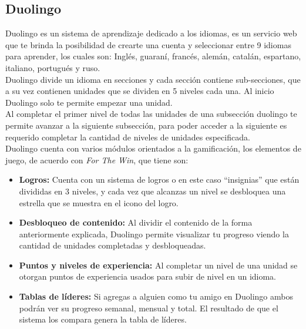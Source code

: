 \begin{multicols*}{2}    
\subsection*{Duolingo}
    
 Duolingo \cite{PagDuolingo} es un sistema de aprendizaje dedicado a los idiomas, es un servicio web que
 te brinda la posibilidad de crearte una cuenta y seleccionar entre 9 idiomas para aprender,
 los cuales son: Inglés, guaraní, francés, alemán, catalán, espartano, italiano, portugués y ruso.\\

 \noindent Duolingo divide un idioma en secciones y cada sección contiene sub-secciones,
 que a su vez contienen unidades que se dividen en 5 niveles cada una. Al inicio Duolingo
 solo te permite empezar una unidad.\\

 \noindent Al completar el primer nivel de todas las unidades de una subsección duolingo
 te permite avanzar a la siguiente subsección, para poder acceder a la siguiente es requerido
 completar la cantidad de niveles de unidades especificada.\\

 \noindent Duolingo cuenta con varios módulos orientados a la gamificación, los elementos
 de juego, de acuerdo con {\em For The Win}, que tiene son:

    \begin{itemize}
    \item {\bf Logros:} Cuenta con un sistema de logros o en este caso ``insignias''
        que están divididas en 3 niveles, y cada vez que alcanzas un nivel se 
        desbloquea una estrella que se muestra en el icono del logro.
            
    \item {\bf Desbloqueo de contenido:} Al dividir el contenido de la forma
        anteriormente explicada, Duolingo permite visualizar tu progreso viendo
        la cantidad de unidades completadas y desbloqueadas.
            
    \item {\bf Puntos y niveles de experiencia:} Al completar un nivel de una unidad
        se otorgan puntos de experiencia usados para subir de nivel en un idioma.
        
    \item {\bf Tablas de líderes:} Si agregas a alguien como tu amigo en Duolingo ambos 
        podrán ver su progreso semanal, mensual y total. El resultado de que el sistema
         los compara genera la tabla de líderes. 
         

\end{itemize}
\end{multicols*}

